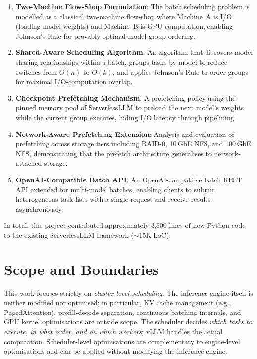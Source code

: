 \documentclass[logo,bsc,singlespacing,parskip,online]{infthesis}
\begin{document}
\begin{enumerate}
\item \textbf{Two-Machine Flow-Shop Formulation}: The batch scheduling problem is modelled as a classical two-machine flow-shop where Machine~A is I/O (loading model weights) and Machine~B is GPU computation, enabling Johnson's Rule for provably optimal model group ordering.

\item \textbf{Shared-Aware Scheduling Algorithm}: An algorithm that discovers model sharing relationships within a batch, groups tasks by model to reduce switches from $O(n)$ to $O(k)$, and applies Johnson's Rule to order groups for maximal I/O-computation overlap.

\item \textbf{Checkpoint Prefetching Mechanism}: A prefetching policy using the pinned memory pool of ServerlessLLM to preload the next model's weights while the current group executes, hiding I/O latency through pipelining.

\item \textbf{Network-Aware Prefetching Extension}: Analysis and evaluation of prefetching across storage tiers including RAID-0, 10\,GbE NFS, and 100\,GbE NFS, demonstrating that the prefetch architecture generalises to network-attached storage.

\item \textbf{OpenAI-Compatible Batch API}: An OpenAI-compatible batch REST API extended for multi-model batches, enabling clients to submit heterogeneous task lists with a single request and receive results asynchronously.
\end{enumerate}

In total, this project contributed approximately 3,500 lines of new Python code to the existing ServerlessLLM framework ($\sim$15K LoC).

\section{Scope and Boundaries}

This work focuses strictly on \textit{cluster-level scheduling}. The inference engine itself is neither modified nor optimised; in particular, KV cache management (e.g., PagedAttention), prefill-decode separation, continuous batching internals, and GPU kernel optimisations are outside scope. The scheduler decides \textit{which tasks to execute, in what order, and on which workers}; vLLM handles the actual computation. Scheduler-level optimisations are complementary to engine-level optimisations and can be applied without modifying the inference engine.
\end{document}
